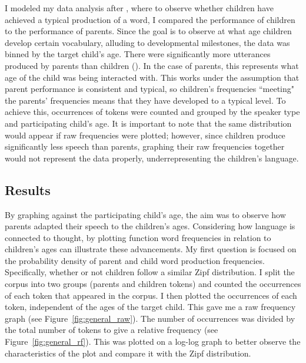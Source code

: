 \documentclass{article}
\theoremstyle{plain}
\theoremstyle{definition}
\theoremstyle{remark}
\numberwithin{equation}{section}
\begin{document}
I modeled my data analysis after \cite{jasbi2020neg}, where to observe whether children have achieved a typical production of a word, I compared the performance of children to the performance of parents. Since the goal is to observe at what age children develop certain vocabulary, alluding to developmental milestones, the data was binned by the target child's age. There were significantly more utterances produced by parents than children (). In the case of parents, this represents what age of the child was being interacted with. This works under the assumption that parent performance is consistent and typical, so children's frequencies ``meeting" the parents' frequencies means that they have developed to a typical level. To achieve this, occurrences of tokens were counted and grouped by the speaker type and participating child's age. It is important to note that the same distribution would appear if raw frequencies were plotted; however, since children produce significantly less speech than parents, graphing their raw frequencies together would not represent the data properly, underrepresenting the children's language. 
\subsection{Results}

By graphing against the participating child's age, the aim was to observe how parents adapted their speech to the children's ages. Considering how language is connected to thought, by plotting function word frequencies in relation to children's ages can illustrate these advancements. My first question is focused on the probability density of parent and child word production frequencies. Specifically, whether or not children follow a similar Zipf distribution. I split the corpus into two groups (parents and children tokens) and counted the occurrences of each token that appeared in the corpus. I then plotted the occurrences of each token, independent of the ages of the target child. This gave me a raw frequency graph (see Figure~\ref{fig:general_raw}). The number of occurrences was divided by the total number of tokens to give a relative frequency (see Figure~\ref{fig:general_rf}). This was plotted on a log-log graph to better observe the characteristics of the plot and compare it with the Zipf distribution. 

\end{document}
